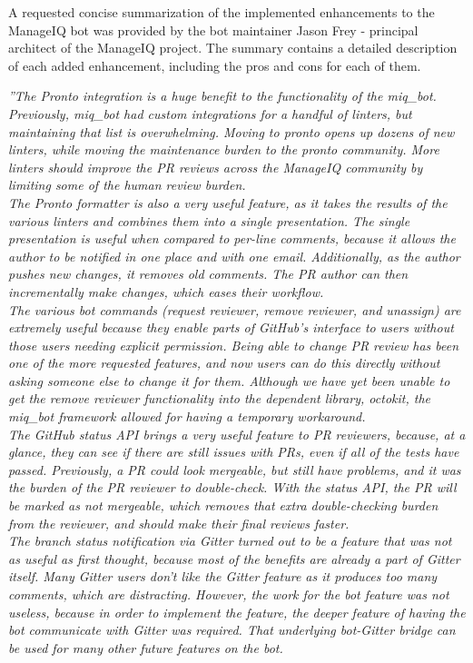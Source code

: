 A requested concise summarization of the implemented enhancements to the ManageIQ bot was provided by the bot maintainer Jason Frey - principal architect of the ManageIQ project. The summary contains a detailed description of each added enhancement, including the pros and cons for each of them.

\begin{displayquote}
\textit{
''The Pronto integration is a huge benefit to the functionality of the miq\_bot. Previously, miq\_bot had custom integrations for a handful of linters, but maintaining that list is overwhelming. Moving to pronto opens up dozens of new linters, while moving the maintenance burden to the pronto community. More linters should improve the PR reviews across the ManageIQ community by limiting some of the human review burden.\\[0.5em]
The Pronto formatter is also a very useful feature, as it takes the results of the various linters and combines them into a single presentation. The single presentation is useful when compared to per-line comments, because it allows the author to be notified in one place and with one email. Additionally, as the author pushes new changes, it removes old comments. The PR author can then incrementally make changes, which eases their workflow.\\[0.5em]
The various bot commands (request reviewer, remove reviewer, and unassign) are extremely useful because they enable parts of GitHub’s interface to users without those users needing explicit permission. Being able to change PR review has been one of the more requested features, and now users can do this directly without asking someone else to change it for them. Although we have yet been unable to get the remove reviewer functionality into the dependent library, octokit, the miq\_bot framework allowed for having a temporary workaround.\\[0.5em]
The GitHub status API brings a very useful feature to PR reviewers, because, at a glance, they can see if there are still issues with PRs, even if all of the tests have passed. Previously, a PR could look mergeable, but still have problems, and it was the burden of the PR reviewer to double-check. With the status API, the PR will be marked as not mergeable, which removes that extra double-checking burden from the reviewer, and should make their final reviews faster.\\[0.5em]
The branch status notification via Gitter turned out to be a feature that was not as useful as first thought, because most of the benefits are already a part of Gitter itself. Many Gitter users don’t like the Gitter feature as it produces too many comments, which are distracting. However, the work for the bot feature was not useless, because in order to implement the feature, the deeper feature of having the bot communicate with Gitter was required. That underlying bot-Gitter bridge can be used for many other future features on the bot.\\[0.5em]
}
\end{displayquote}
